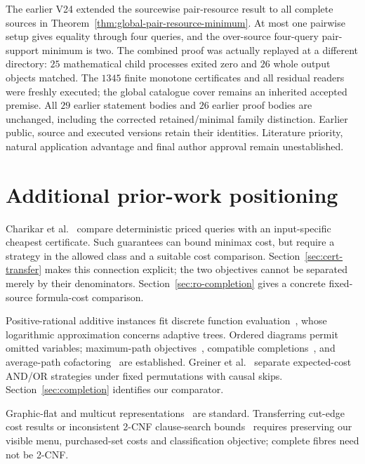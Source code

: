 \documentclass[pdflatex,sn-mathphys-num]{sn-jnl}
\theoremstyle{thmstyleone}
\theoremstyle{thmstylethree}
\theoremstyle{thmstyletwo}
\begin{document}
The earlier V24 extended the sourcewise pair-resource result to all
complete sources in Theorem~\ref{thm:global-pair-resource-minimum}.
At most one pairwise setup gives equality through four queries, and
the over-source four-query pair-support minimum is two. The combined
proof was actually replayed at a different directory: $25$ mathematical
child processes exited zero and $26$ whole output objects matched.
The $1345$ finite monotone certificates and all residual readers were
freshly executed; the global catalogue cover remains an inherited
accepted premise. All $29$ earlier statement bodies and $26$ earlier
proof bodies are unchanged, including the corrected retained/minimal
family distinction. Earlier public, source and executed versions retain
their identities. Literature priority, natural application advantage
and final author approval remain unestablished.




\section{Additional prior-work positioning}\label{app:additional-positioning}
Charikar et al.~\cite{charikar02} compare deterministic priced queries with an input-specific cheapest certificate. Such guarantees can bound minimax cost, but require a strategy in the allowed class and a suitable cost comparison. Section~\ref{sec:cert-transfer} makes this connection explicit; the two objectives cannot be separated merely by their denominators. Section~\ref{sec:ro-completion} gives a concrete fixed-source formula-cost comparison.

Positive-rational additive instances fit discrete function evaluation~\cite{cicalese14}, whose logarithmic approximation concerns adaptive trees. Ordered diagrams permit omitted variables; maximum-path objectives~\cite{ebendt06,ebendt05}, compatible completions~\cite{oliveira,sasao}, and average-path cofactoring~\cite{jiang} are established. Greiner et al.~\cite{greiner} separate expected-cost AND/OR strategies under fixed permutations with causal skips. Section~\ref{sec:completion} identifies our comparator.

Graphic-flat and multicut representations~\cite{berczi,hornakova} are standard. Transferring cut-edge cost results or inconsistent 2-CNF clause-search bounds~\cite{lovasz} requires preserving our visible menu, purchased-set costs and classification objective; complete fibres need not be 2-CNF.
\end{document}
